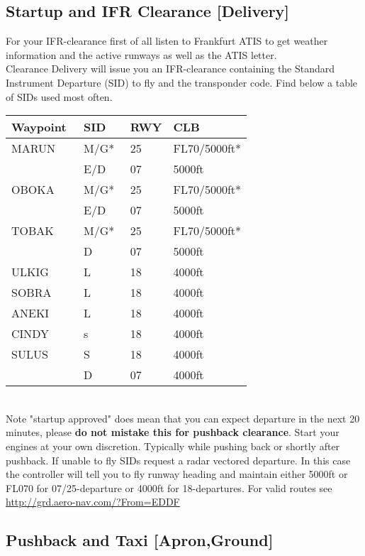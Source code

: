 \subsection[DEL]{Startup and IFR Clearance [Delivery]}
For your IFR-clearance first of all listen to Frankfurt ATIS to
get weather information and the active runways as well as
the ATIS letter.\\
Clearance Delivery will issue you an IFR-clearance containing the Standard Instrument Departure (SID) to fly and the transponder code. Find below a table of SIDs used most often.\\
\begin{table}[h]
	\begin{tabular}{|l|l|l|l|}
		\hline
		\textbf{Waypoint} & \textbf{SID}  & \textbf{RWY} & \textbf{CLB}\\\hline
		MARUN    & M/G*	& 25 & FL70/5000ft*	\\
				 & E/D	& 07 & 5000ft   	\\\hline
		OBOKA    & M/G*	& 25 & FL70/5000ft* \\
				 & E/D	& 07 & 5000ft   	\\\hline
		TOBAK    & M/G*	& 25 & FL70/5000ft*	\\
				 & D	& 07 & 5000ft   	\\\hline
		ULKIG    & L    & 18 & 4000ft 		\\\hline
		SOBRA    & L    & 18 & 4000ft 		\\\hline
		ANEKI    & L    & 18 & 4000ft 		\\\hline
		CINDY    & s    & 18 & 4000ft 		\\\hline
		SULUS    & S    & 18 & 4000ft  		\\
				 & D    & 07 & 4000ft 		\\
		\hline
	\end{tabular}
\end{table}
\\
Note "startup approved" does mean that you can expect departure in the next 20 minutes, please \textbf{do not mistake this for pushback clearance}. Start your engines at your own discretion. Typically while pushing back or shortly after
pushback.
If unable to fly SIDs request a radar vectored departure. In this case the controller will tell you to fly runway heading and maintain either 5000ft or FL070 for 07/25-departure or 4000ft for 18-departures.
For valid routes see \url{http://grd.aero-nav.com/?From=EDDF}

\subsection[GND]{Pushback and Taxi [Apron,Ground]}
